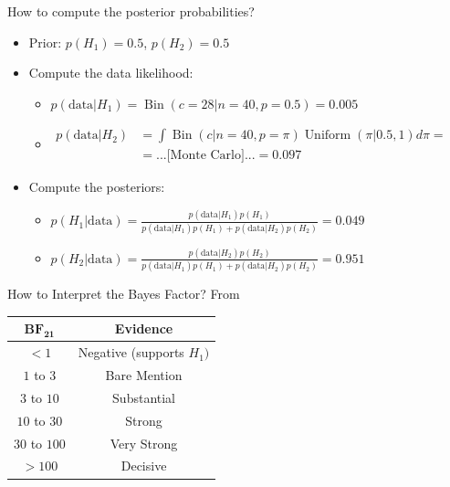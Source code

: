 \documentclass[aspectratio=169]{beamer}
\newcommand{\Bin}{\operatorname{{\mathrm Bin}}}
\newcommand{\Uniform}{\operatorname{{\mathrm Uniform}}}
\begin{document}
\begin{frame}{How to compute the posterior probabilities?}
  \begin{itemize}
  \item Prior: $p(H_1) = 0.5$, $p(H_2) = 0.5$
  \item Compute the data likelihood:
    \begin{itemize}
    \item $p(\text{data}|H_1) = \Bin(c=28|n=40,p=0.5) = 0.005$
    \item $\begin{aligned}
      p(\text{data}|H_2) & = \int \Bin(c|n=40, p=\pi)
      \Uniform(\pi|0.5,1) d\pi = \\
      & = \text{...[Monte Carlo]...} = 0.097
      \end{aligned}$
    \end{itemize}
  \item Compute the posteriors:
    \begin{itemize}
    \item $p(H_1|\text{data}) = \frac{p(\text{data}|H_1)
        p(H_1)}{p(\text{data}|H_1) p(H_1) + p(\text{data}|H_2) p(H_2)} =
      0.049$
    \item $p(H_2|\text{data}) = \frac{p(\text{data}|H_2)
        p(H_2)}{p(\text{data}|H_1) p(H_1) + p(\text{data}|H_2) p(H_2)} =
      0.951$
    \end{itemize} 
  \end{itemize}
\end{frame}


\begin{frame}{How to Interpret the Bayes Factor?}
From \cite{jeffreys1961theory,kass1995bayes}
\begin{center}
  \begin{tabular}{c || c }
    $\mathbf{\text{BF}_{2 1}}$ & \textbf{Evidence} \\
    \hline
    \hline
    $< 1$ & Negative (supports $H_1)$\\
    \hline
    $1$ to $3$ & Bare Mention \\
    \hline
    $3$ to $10$ & Substantial \\
    \hline
    $10$ to $30$ & Strong \\
    \hline
    $30$ to $100$ & Very Strong \\
    \hline
    $>100$ & Decisive \\ 
    \hline
  \end{tabular}
\end{center}
\end{frame}
\end{document}
